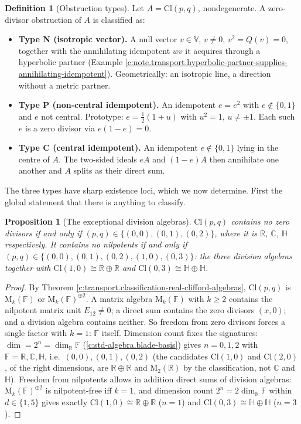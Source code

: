 \documentclass[11pt]{article}
\newtheorem{proposition}[theorem]{Proposition}
\theoremstyle{definition}
\newtheorem{definition}[theorem]{Definition}
\theoremstyle{plain}
\providecommand{\C}{}\renewcommand{\C}{\mathbb{C}}
\providecommand{\Cl}{}\renewcommand{\Cl}{\mathrm{Cl}}
\providecommand{\HH}{}\renewcommand{\HH}{\mathbb{H}}
\providecommand{\Mat}{}\renewcommand{\Mat}{\mathrm{M}}
\providecommand{\R}{}\renewcommand{\R}{\mathbb{R}}
\begin{document}
\begin{definition}[Obstruction types]\label{c:obj.transport.obstruction-types}
Let $A = \Cl(p,q)$, nondegenerate. A zero-divisor obstruction of $A$ is classified as:
\begin{itemize}
\item \textbf{Type N (isotropic vector).} A null vector $v \in \mathbb{V}$, $v \neq 0$, $v^2 = Q(v) = 0$, together with the annihilating idempotent $wv$ it acquires through a hyperbolic partner (Example \ref{c:note.transport.hyperbolic-partner-supplies-annihilating-idempotent}). Geometrically: an isotropic line, a direction without a metric partner.
\item \textbf{Type P (non-central idempotent).} An idempotent $e = e^2$ with $e \notin \{0, 1\}$ and $e$ not central. Prototype: $e = \tfrac12(1 + u)$ with $u^2 = 1$, $u \neq \pm 1$. Each such $e$ is a zero divisor via $e(1 - e) = 0$.
\item \textbf{Type C (central idempotent).} An idempotent $e \notin \{0,1\}$ lying in the centre of $A$. The two-sided ideals $eA$ and $(1-e)A$ then annihilate one another and $A$ splits as their direct sum.
\end{itemize}
\end{definition}

\label{c:note.transport.setting-taxonomy-obstructions}
The three types have sharp existence loci, which we now determine. First the global statement that there is anything to classify.

\begin{proposition}[The exceptional division algebras]\label{c:transport.exceptional-division-algebras}
$\Cl(p,q)$ contains no zero divisors if and only if $(p,q) \in \{(0,0), (0,1), (0,2)\}$, where it is $\R$, $\C$, $\HH$ respectively. It contains no nilpotents if and only if $(p,q) \in \{(0,0), (0,1), (0,2), (1,0), (0,3)\}$: the three division algebras together with $\Cl(1,0) \cong \R \oplus \R$ and $\Cl(0,3) \cong \HH \oplus \HH$.
\end{proposition}
\begin{proof}
By Theorem \ref{c:transport.classification-real-clifford-algebras}, $\Cl(p,q)$ is $\Mat_k(\mathbb{F})$ or $\Mat_k(\mathbb{F})^{\oplus 2}$. A matrix algebra $\Mat_k(\mathbb{F})$ with $k \geq 2$ contains the nilpotent matrix unit $E_{12} \neq 0$; a direct sum contains the zero divisors $(x, 0)$; and a division algebra contains neither. So freedom from zero divisors forces a single factor with $k = 1$: $\mathbb{F}$ itself. Dimension count fixes the signatures: $\dim = 2^n = \dim_\R \mathbb{F}$ (\ref{c:std-algebra.blade-basis}) gives $n = 0, 1, 2$ with $\mathbb{F} = \R, \C, \HH$, i.e.\ $(0,0), (0,1), (0,2)$ (the candidates $\Cl(1,0)$ and $\Cl(2,0)$, of the right dimensions, are $\R \oplus \R$ and $\Mat_2(\R)$ by the classification, not $\C$ and $\HH$). Freedom from nilpotents allows in addition direct sums of division algebras: $\Mat_k(\mathbb{F})^{\oplus 2}$ is nilpotent-free iff $k = 1$, and dimension count $2^n = 2\dim_\R \mathbb{F}$ within $d \in \{1,5\}$ gives exactly $\Cl(1,0) \cong \R \oplus \R$ ($n=1$) and $\Cl(0,3) \cong \HH \oplus \HH$ ($n=3$).

\end{proof}
\end{document}
